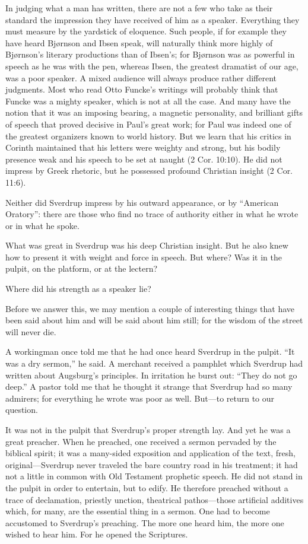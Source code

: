 In judging what a man has written, there are not a few who take as their standard the impression they have received of him as a speaker. Everything they must measure by the yardstick of eloquence. Such people, if for example they have heard Bjørnson and Ibsen speak, will naturally think more highly of Bjørnson’s literary productions than of Ibsen’s; for Bjørnson was as powerful in speech as he was with the pen, whereas Ibsen, the greatest dramatist of our age, was a poor speaker. A mixed audience will always produce rather different judgments. Most who read Otto Funcke’s writings will probably think that Funcke was a mighty speaker, which is not at all the case. And many have the notion that it was an imposing bearing, a magnetic personality, and brilliant gifts of speech that proved decisive in Paul’s great work; for Paul was indeed one of the greatest organizers known to world history. But we learn that his critics in Corinth maintained that his letters were weighty and strong, but his bodily presence weak and his speech to be set at naught (2 Cor. 10:10). He did not impress by Greek rhetoric, but he possessed profound Christian insight (2 Cor. 11:6).

Neither did Sverdrup impress by his outward appearance, or by “American Oratory”: there are those who find no trace of authority either in what he wrote or in what he spoke.

What was great in Sverdrup was his deep Christian insight. But he also knew how to present it with weight and force in speech. But where? Was it in the pulpit, on the platform, or at the lectern? 

Where did his strength as a speaker lie?

Before we answer this, we may mention a couple of interesting things that have been said about him and will be said about him still; for the wisdom of the street will never die.

A workingman once told me that he had once heard Sverdrup in the pulpit. “It was a dry sermon,” he said. A merchant received a pamphlet which Sverdrup had written about Augsburg’s principles. In irritation he burst out: “They do not go deep.” A pastor told me that he thought it strange that Sverdrup had so many admirers; for everything he wrote was poor as well. But—to return to our question.

It was not in the pulpit that Sverdrup’s proper strength lay. And yet he was a great preacher. When he preached, one received a sermon pervaded by the biblical spirit; it was a many-sided exposition and application of the text, fresh, original—Sverdrup never traveled the bare country road in his treatment; it had not a little in common with Old Testament prophetic speech. He did not stand in the pulpit in order to entertain, but to edify. He therefore preached without a trace of declamation, priestly unction, theatrical pathos—those artificial additives which, for many, are the essential thing in a sermon. One had to become accustomed to Sverdrup’s preaching. The more one heard him, the more one wished to hear him. For he opened the Scriptures.

